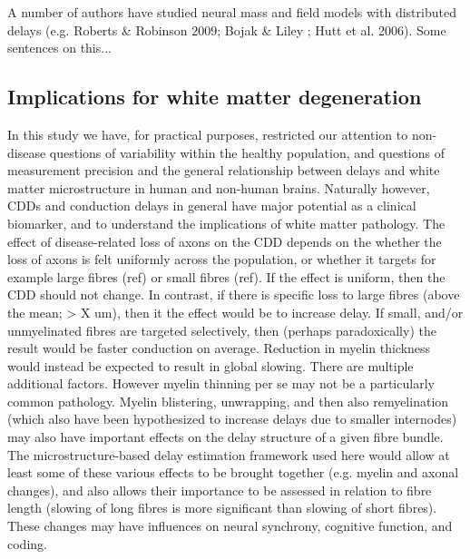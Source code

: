 A number of authors have studied neural mass and field models with distributed delays (e.g. Roberts \& Robinson 2009; Bojak \& Liley ; Hutt et al. 2006). Some sentences on this...



% 


\subsection{Implications for white matter degeneration}

In this study we have, for practical purposes, restricted our attention to non-disease questions of variability within the healthy population, and questions of measurement precision and the general relationship between delays and white matter microstructure in human and non-human brains. Naturally however, CDDs and conduction delays in general have major potential as a clinical biomarker, and to understand the implications of white matter pathology. The effect of disease-related loss of axons on the CDD depends on the whether the loss of axons is felt uniformly across the population, or whether it targets for example large fibres (ref) or small fibres (ref). If the effect is uniform, then the CDD should not change. In contrast, if there is specific loss to large fibres (above the mean; > X um), then it the effect would be to increase delay. If small, and/or unmyelinated fibres are targeted selectively, then (perhaps paradoxically) the result would be faster conduction on average. Reduction in myelin thickness would instead be expected to result in global slowing. There are multiple additional factors. However myelin thinning per se may not be a particularly common pathology. Myelin blistering, unwrapping, and then also remyelination (which also have been hypothesized to increase delays due to smaller internodes) may also have important effects on the delay structure of a given fibre bundle. The microstructure-based delay estimation framework used here would allow at least some of these various effects to be brought together (e.g. myelin and axonal changes), and also allows their importance to be assessed in relation to fibre length (slowing of long fibres is more significant than slowing of short fibres).  These changes may have influences on  neural synchrony, cognitive function, and coding.



